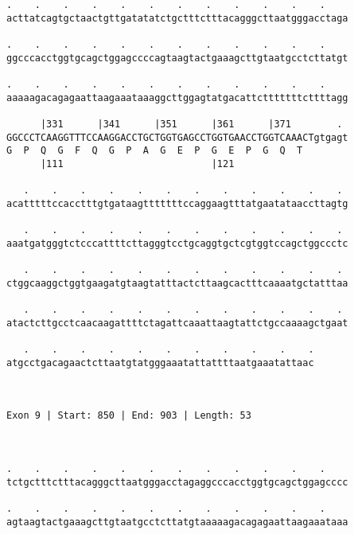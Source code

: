 \documentclass{article}
\begin{document}
\begin{Verbatim}
.    .    .    .    .    .    .    .    .    .    .    .    
acttatcagtgctaactgttgatatatctgctttctttacagggcttaatgggacctaga
                                                            
.    .    .    .    .    .    .    .    .    .    .    .    
ggcccacctggtgcagctggagccccagtaagtactgaaagcttgtaatgcctcttatgt
                                                            
.    .    .    .    .    .    .    .    .    .    .    .    
aaaaagacagagaattaagaaataaaggcttggagtatgacattctttttttcttttagg
                                                            
      |331      |341      |351      |361      |371        . 
GGCCCTCAAGGTTTCCAAGGACCTGCTGGTGAGCCTGGTGAACCTGGTCAAACTgtgagt
G  P  Q  G  F  Q  G  P  A  G  E  P  G  E  P  G  Q  T        
      |111                          |121                    
  
   .    .    .    .    .    .    .    .    .    .    .    . 
acatttttccacctttgtgataagtttttttccaggaagtttatgaatataaccttagtg
                                                            
   .    .    .    .    .    .    .    .    .    .    .    . 
aaatgatgggtctcccattttcttagggtcctgcaggtgctcgtggtccagctggccctc
                                                            
   .    .    .    .    .    .    .    .    .    .    .    . 
ctggcaaggctggtgaagatgtaagtatttactcttaagcactttcaaaatgctatttaa
                                                            
   .    .    .    .    .    .    .    .    .    .    .    . 
atactcttgcctcaacaagattttctagattcaaattaagtattctgccaaaagctgaat
                                                            
   .    .    .    .    .    .    .    .    .    .    .
atgcctgacagaactcttaatgtatgggaaatattattttaatgaaatattaac
                                                      
                                                      
 
Exon 9 | Start: 850 | End: 903 | Length: 53



.    .    .    .    .    .    .    .    .    .    .    .    
tctgctttctttacagggcttaatgggacctagaggcccacctggtgcagctggagcccc
                                                            
.    .    .    .    .    .    .    .    .    .    .    .    
agtaagtactgaaagcttgtaatgcctcttatgtaaaaagacagagaattaagaaataaa
                                                            

\end{Verbatim}
\end{document}
